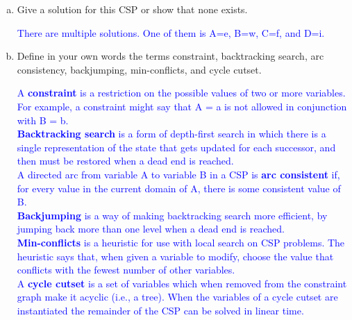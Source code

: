 \documentclass[a4paper]{article}
\begin{document}
\begin{enumerate}[(a)]
\item Give a solution for this CSP or show that none exists. 

\textcolor{blue}{There are multiple solutions. One of them is A=e, B=w, C=f, and D=i.}

\item Define in your own words the terms constraint, backtracking search, arc consistency, backjumping, min-conflicts, and cycle cutset.

\textcolor{blue}{A \textbf{constraint} is a restriction on the possible values of two or more variables. For example, a constraint might say that A = a is not allowed in conjunction with B = b. \\
\textbf{Backtracking search} is a form of depth-first search in which there is a single representation of the state that gets updated for each successor, and then must be restored when a dead end is reached. \\
A directed arc from variable A to variable B in a CSP is \textbf{arc consistent} if, for every value in the current domain of A, there is some consistent value of B. \\
\textbf{Backjumping} is a way of making backtracking search more efficient, by jumping back more than one level when a dead end is reached.\\
\textbf{Min-conflicts} is a heuristic for use with local search on CSP problems. The heuristic says that, when given a variable to modify, choose the value that conflicts with the fewest number of other variables. \\
A \textbf{cycle cutset} is a set of variables which when removed from the constraint graph make it acyclic (i.e., a tree). When the variables of a cycle cutset are instantiated the remainder of the CSP can be solved in linear time.}


\end{enumerate}
\end{document}
